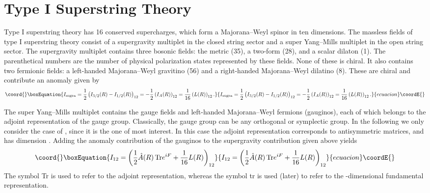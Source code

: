 \documentclass[a4paper,12pt]{article}
\begin{document}
\section{Type I Superstring Theory}
Type I superstring theory has 16 conserved supercharges, which
form a Majorana--Weyl spinor in ten dimensions. The massless
fields of type I superstring theory consist of a supergravity
multiplet in the closed string sector and a super Yang--Mills
multiplet in the open string sector. The supergravity multiplet
contains three bosonic fields: the metric (35), a two-form (28),
and a scalar dilaton (1). The parenthetical numbers are the number
of physical polarization states represented by these fields. None
of these is chiral. It also contains two fermionic fields: a
left-handed Majorana--Weyl gravitino (56) and a right-handed
Majorana--Weyl dilatino (8). These are chiral and contribute an
anomaly given by
\begin{equation}\coord{}\boxEquation{
I_{\rm sugra} = {1 \over 2} \left( I_{3/2} (R) - I_{1/2}
(R)\right)_{12} = - {1\over 2} \left( I_A(R) \right)_{12} = {1
\over 16} \left( L(R) \right)_{12}.
}{
I_{\rm sugra} = {1 \over 2} \left( I_{3/2} (R) - I_{1/2}
(R)\right)_{12} = - {1\over 2} \left( I_A(R) \right)_{12} = {1
\over 16} \left( L(R) \right)_{12}.
}{ecuacion}\coordE{}\end{equation}

The super Yang--Mills multiplet contains the gauge fields and
left-handed Majorana--Weyl fermions (gauginos), each of which belongs to the
adjoint representation of the gauge group. Classically, the gauge
group can be any orthogonal or symplectic group. In the following
we only consider the case of \coordHE{}, since it is the one of most
interest. In this case the adjoint representation corresponds to
antisymmetric \coordHE{} matrices, and has dimension \coordHE{}.
Adding the anomaly contribution of the gauginos to the
supergravity contribution given above yields
\begin{equation}\coord{}\boxEquation{ \label{typeIanomaly}
I_{12} = \left( {1\over2} \hat A (R)\, {\rm Tr} e^{iF} + {1 \over
16} L(R) \right)_{12}
}{ I_{12} = \left( {1\over2} \hat A (R)\, {\rm Tr} e^{iF} + {1 \over
16} L(R) \right)_{12}
}{ecuacion}\coordE{}\end{equation}
The symbol Tr is used to refer to the adjoint representation,
whereas the symbol tr is used (later) to refer to the
\coordHE{}-dimensional fundamental representation.
\end{document}
